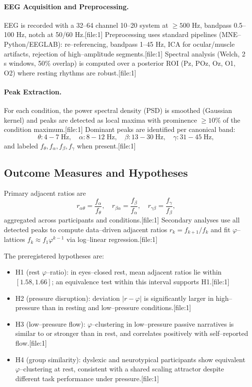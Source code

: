 \documentclass[11pt]{article}
\begin{document}
\paragraph{EEG Acquisition and Preprocessing.}
EEG is recorded with a 32--64 channel 10--20 system at $\ge 500$ Hz, bandpass 0.5--100 Hz, notch at 50/60 Hz.[file:1]
Preprocessing uses standard pipelines (MNE--Python/EEGLAB): re--referencing, bandpass 1--45 Hz, ICA for ocular/muscle artifacts, rejection of high--amplitude segments.[file:1]
Spectral analysis (Welch, 2 s windows, 50\% overlap) is computed over a posterior ROI (Pz, POz, Oz, O1, O2) where resting rhythms are robust.[file:1]

\paragraph{Peak Extraction.}
For each condition, the power spectral density (PSD) is smoothed (Gaussian kernel) and peaks are detected as local maxima with prominence $\ge 10\%$ of the condition maximum.[file:1]
Dominant peaks are identified per canonical band:
\[
\theta: 4\!-\!7\;\mathrm{Hz},\quad
\alpha: 8\!-\!12\;\mathrm{Hz},\quad
\beta: 13\!-\!30\;\mathrm{Hz},\quad
\gamma: 31\!-\!45\;\mathrm{Hz},
\]
and labeled $f_{\theta}, f_{\alpha}, f_{\beta}, f_{\gamma}$ when present.[file:1]

\subsection{Outcome Measures and Hypotheses}

Primary adjacent ratios are
\[
r_{\alpha\theta} = \frac{f_{\alpha}}{f_{\theta}},\quad
r_{\beta\alpha} = \frac{f_{\beta}}{f_{\alpha}},\quad
r_{\gamma\beta} = \frac{f_{\gamma}}{f_{\beta}},
\]
aggregated across participants and conditions.[file:1]
Secondary analyses use all detected peaks to compute data--driven adjacent ratios $r_{k} = f_{k+1}/f_{k}$ and fit $\varphi$--lattices $f_{k} \approx f_{1}\varphi^{k-1}$ via log--linear regression.[file:1]

The preregistered hypotheses are:

\begin{itemize}
\item H1 (rest $\varphi$--ratio): in eyes--closed rest, mean adjacent ratios lie within $[1.58,1.66]$; an equivalence test within this interval supports H1.[file:1]
\item H2 (pressure disruption): deviation $|r - \varphi|$ is significantly larger in high--pressure than in resting and low--pressure conditions.[file:1]
\item H3 (low--pressure flow): $\varphi$--clustering in low--pressure passive narratives is similar to or stronger than in rest, and correlates positively with self--reported flow.[file:1]
\item H4 (group similarity): dyslexic and neurotypical participants show equivalent $\varphi$--clustering at rest, consistent with a shared scaling attractor despite different task performance under pressure.[file:1]
\end{itemize}
\end{document}
